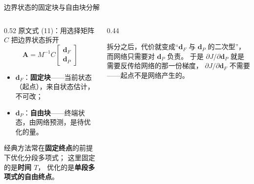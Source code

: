 \begin{frame}{边界状态的固定块与自由块分解}
  \small
  \begin{columns}[t]
    \begin{column}{0.52\textwidth}
      原文式 (11)：用选择矩阵 $C$ 把边界状态拆开
      \[
        \mathbf A=M^{-1}C\begin{bmatrix}\mathbf d_F\\ \mathbf d_P\end{bmatrix}
      \]
      \begin{itemize}\tight
        \item $\mathbf d_F$：\textbf{固定块}——当前状态（起点），来自状态估计，不可改；
        \item $\mathbf d_P$：\textbf{自由块}——终端状态，由网络预测，是待优化的量。
      \end{itemize}
      \begin{paperfinding}[与经典方法的差别]
        \small
        经典方法常在\textbf{固定终点}的前提下优化分段多项式；
        这里固定的是\textbf{时间 $T$}，
        优化的是\textbf{单段多项式的自由终点}。
      \end{paperfinding}
    \end{column}
    \begin{column}{0.44\textwidth}
      \begin{teach}[该拆分的意义]
        \small
        拆分之后，代价就变成“$\mathbf d_F$ 与 $\mathbf d_P$ 的二次型”，
        而网络只需要对 $\mathbf d_P$ 负责。
        于是 $\partial J/\partial\mathbf d_P$ 就是需要反传给网络的那一份梯度，
        $\partial J/\partial\mathbf d_F$ 不需要——起点不是网络产生的。
      \end{teach}
    \end{column}
  \end{columns}
\end{frame}

